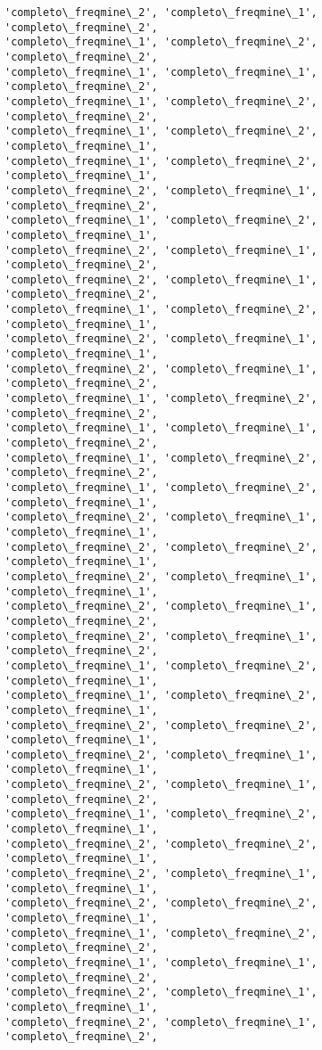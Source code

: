 \documentclass[11pt]{article}
\begin{document}
\begin{Verbatim}[commandchars=\\\{\}]
'completo\_freqmine\_2', 'completo\_freqmine\_1', 'completo\_freqmine\_2',
'completo\_freqmine\_1', 'completo\_freqmine\_2', 'completo\_freqmine\_2',
'completo\_freqmine\_1', 'completo\_freqmine\_1', 'completo\_freqmine\_2',
'completo\_freqmine\_1', 'completo\_freqmine\_2', 'completo\_freqmine\_2',
'completo\_freqmine\_1', 'completo\_freqmine\_2', 'completo\_freqmine\_1',
'completo\_freqmine\_1', 'completo\_freqmine\_2', 'completo\_freqmine\_1',
'completo\_freqmine\_2', 'completo\_freqmine\_1', 'completo\_freqmine\_2',
'completo\_freqmine\_1', 'completo\_freqmine\_2', 'completo\_freqmine\_1',
'completo\_freqmine\_2', 'completo\_freqmine\_1', 'completo\_freqmine\_2',
'completo\_freqmine\_2', 'completo\_freqmine\_1', 'completo\_freqmine\_2',
'completo\_freqmine\_1', 'completo\_freqmine\_2', 'completo\_freqmine\_1',
'completo\_freqmine\_2', 'completo\_freqmine\_1', 'completo\_freqmine\_1',
'completo\_freqmine\_2', 'completo\_freqmine\_1', 'completo\_freqmine\_2',
'completo\_freqmine\_1', 'completo\_freqmine\_2', 'completo\_freqmine\_2',
'completo\_freqmine\_1', 'completo\_freqmine\_1', 'completo\_freqmine\_2',
'completo\_freqmine\_1', 'completo\_freqmine\_2', 'completo\_freqmine\_2',
'completo\_freqmine\_1', 'completo\_freqmine\_2', 'completo\_freqmine\_1',
'completo\_freqmine\_2', 'completo\_freqmine\_1', 'completo\_freqmine\_1',
'completo\_freqmine\_2', 'completo\_freqmine\_2', 'completo\_freqmine\_1',
'completo\_freqmine\_2', 'completo\_freqmine\_1', 'completo\_freqmine\_1',
'completo\_freqmine\_2', 'completo\_freqmine\_1', 'completo\_freqmine\_2',
'completo\_freqmine\_2', 'completo\_freqmine\_1', 'completo\_freqmine\_2',
'completo\_freqmine\_1', 'completo\_freqmine\_2', 'completo\_freqmine\_1',
'completo\_freqmine\_1', 'completo\_freqmine\_2', 'completo\_freqmine\_1',
'completo\_freqmine\_2', 'completo\_freqmine\_2', 'completo\_freqmine\_1',
'completo\_freqmine\_2', 'completo\_freqmine\_1', 'completo\_freqmine\_1',
'completo\_freqmine\_2', 'completo\_freqmine\_1', 'completo\_freqmine\_2',
'completo\_freqmine\_1', 'completo\_freqmine\_2', 'completo\_freqmine\_1',
'completo\_freqmine\_2', 'completo\_freqmine\_2', 'completo\_freqmine\_1',
'completo\_freqmine\_2', 'completo\_freqmine\_1', 'completo\_freqmine\_1',
'completo\_freqmine\_2', 'completo\_freqmine\_2', 'completo\_freqmine\_1',
'completo\_freqmine\_1', 'completo\_freqmine\_2', 'completo\_freqmine\_2',
'completo\_freqmine\_1', 'completo\_freqmine\_1', 'completo\_freqmine\_2',
'completo\_freqmine\_2', 'completo\_freqmine\_1', 'completo\_freqmine\_1',
'completo\_freqmine\_2', 'completo\_freqmine\_1', 'completo\_freqmine\_2',

\end{Verbatim}
\end{document}
